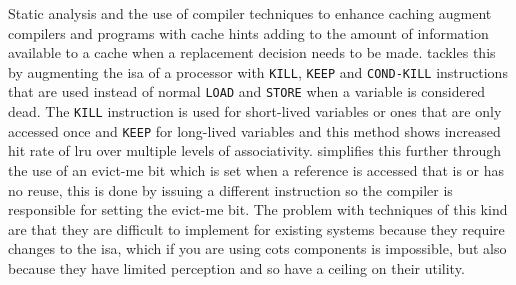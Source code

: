 Static analysis and the use of compiler techniques to enhance caching augment compilers and programs with cache hints adding to the amount of information available to a cache when a replacement decision needs to be made. \citet{jainSoftwareassistedCacheReplacement2001} tackles this by augmenting the \gls{isa} of a processor with \texttt{KILL}, \texttt{KEEP} and \texttt{COND-KILL} instructions that are used instead of normal \texttt{LOAD} and \texttt{STORE} when a variable is considered dead. The \texttt{KILL} instruction is used for short-lived variables or ones that are only accessed once and \texttt{KEEP} for long-lived variables and this method shows increased hit rate of \gls{lru} over multiple levels of associativity. \citet{zhenlinwangUsingCompilerImprove2002} simplifies this further through the use of an evict-me bit which is set when a reference is accessed that is  or has no reuse, this is done by issuing a different instruction so the compiler is responsible for setting the evict-me bit. The problem with techniques of this kind are that they are difficult to implement for existing systems because they require changes to the \gls{isa}, which if you are using \gls{cots} components is impossible, but also because they have limited perception and so have a ceiling on their utility.

